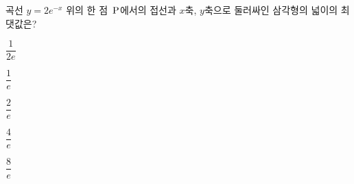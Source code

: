 곡선 $y=2e^{-x}$ 위의 한 점~$\mathrm{P}$에서의 접선과 $x$축, $y$축으로 둘러싸인 삼각형의 넓이의 최댓값은? 
\begin{choices32}{\rule[-3ex]{0pt}{8ex}$\dfrac{1}{2e}$}{\rule[-3ex]{0pt}{8ex}$\dfrac{1}{e}$}{\rule[-3ex]{0pt}{8ex}$\dfrac{2}{e}$}{\rule[-3ex]{0pt}{8ex}$\dfrac{4}{e}$}{\rule[-3ex]{0pt}{8ex}$\dfrac{8}{e}$}\end{choices32}
